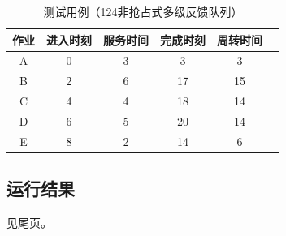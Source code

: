 \documentclass[UTF8]{ctexart}
\begin{document}
\begin{table}[htbp]
    \caption{测试用例（124非抢占式多级反馈队列）}
    \centering
    \begin{tabular}{cccccc}
        \toprule
        作业 & 进入时刻 & 服务时间 & 完成时刻 & 周转时间 \\
        \midrule
        A  & 0    & 3    & 3    & 3    \\
        B  & 2    & 6    & 17   & 15   \\
        C  & 4    & 4    & 18   & 14   \\
        D  & 6    & 5    & 20   & 14   \\
        E  & 8    & 2    & 14   & 6    \\
        \bottomrule
    \end{tabular}
    \qquad
\end{table}

\subsection{运行结果}

见尾页。
\end{document}
